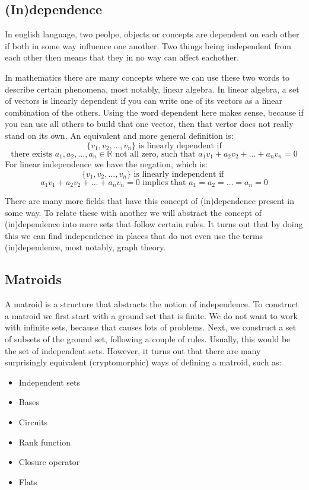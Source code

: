 \subsection{(In)dependence}

In english language, two peolpe, objects or concepts are dependent on each other if both in some way influence one another. Two things being independent from each other then means that they in no way can affect eachother. 

In mathematics there are many concepts where we can use these two words to describe certain phenomena, most notably, linear algebra. In linear algebra, a set of vectors is linearly dependent if you can write one of its vectors as a linear combination of the others. Using the word dependent here makes sense, because if you can use all others to build that one vector, then that vertor does not really stand on its own. An equivalent and more general definition is:
$$ \{v_1,v_2,\dots,v_n\} \text{ is linearly dependent if} $$ $$ \text{there exists } a_1,a_2,\dots,a_n \in \mathbb{R} \text{ not all zero, such that } a_1v_1+a_2v_2+\dots +a_nv_n = 0$$
For linear independence we have the negation, which is:
$$ \{v_1,v_2,\dots,v_n\} \text{ is linearly independent if } $$ $$ a_1v_1+a_2v_2+\dots+a_nv_n=0 \text{ implies that } a_1=a_2=\dots=a_n=0 $$

There are many more fields that have this concept of (in)dependence present in some way. To relate these with another we will abstract the concept of (in)dependence into mere sets that follow certain rules. It turns out that by doing this we can find independence in places that do not even use the terms (in)dependence, most notably, graph theory.






\newpage

\subsection{Matroids}

A matroid is a structure that abstracts the notion of independence. To construct a matroid we first start with a ground set that is finite. We do not want to work with infinite sets, because that causes lots of problems. Next, we construct a set of subsets of the ground set, following a couple of rules. Usually, this would be the set of independent sets. However, it turns out that there are many surprisingly equivalent (cryptomorphic) ways of defining a matroid, such as:
\begin{itemize}
    \item Independent sets
    \item Bases
    \item Circuits
    \item Rank function
    \item Closure operator
    \item Flats
\end{itemize}

